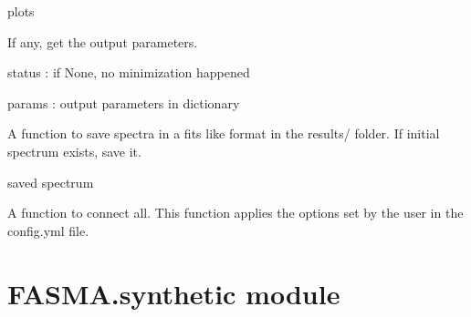 \documentclass[letterpaper,10pt,english]{sphinxmanual}
\begin{document}
\begin{fulllineitems}
\begin{fulllineitems}
plots

\end{fulllineitems}


\begin{fulllineitems}
\label{\detokenize{index:FASMA.synthDriver.FASMA.result}}
If any, get the output parameters.

status : if None, no minimization happened

params : output parameters in dictionary

\end{fulllineitems}


\begin{fulllineitems}
\label{\detokenize{index:FASMA.synthDriver.FASMA.saveRunner}}
A function to save spectra in a fits like format in the results/ folder.
If initial spectrum exists, save it.

saved spectrum

\end{fulllineitems}


\begin{fulllineitems}
\label{\detokenize{index:FASMA.synthDriver.FASMA.synthdriver}}
A function to connect all. This function applies the options set by
the user in the config.yml file.

\end{fulllineitems}


\end{fulllineitems}



\section{FASMA.synthetic module}
\label{\detokenize{index:module-FASMA.synthetic}}\label{\detokenize{index:fasma-synthetic-module}}
\end{document}
